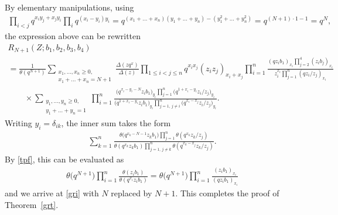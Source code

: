 By elementary manipulations, using
\begin{gather*}\prod\limits_{i<j}q^{x_iy_j+x_jy_i}\prod\limits_i q^{(x_i-y_i)y_i}=q^{(x_1+\dots+x_n)(y_1+\dots+y_n)-(y_1^2+\dots+y_n^2)}=q^{(N+1)\cdot 1-1}=q^N, \end{gather*}
the expression above can be rewritten
\begin{gather*}R_{N+1}(Z;b_1,b_2,b_3,b_4)\\
=\frac{1}{\theta(q^{N+1})}\sum_{\substack{x_1,\dots,x_n\geq 0,\\x_1+\dots+x_n=N+1}}
\frac{\Delta(zq^{x})}{\Delta(z)}\prod\limits_{1\leq i<j\leq n}q^{x_ix_j}(z_iz_j)_{x_i+x_j}
\prod\limits_{i=1}^n\frac{(qz_ib_1)_{x_i}\prod\limits_{j=2}^4(z_ib_j)_{x_i}}{z_i^{x_i}\prod\limits_{j=1}^n(qz_i/z_j)_{x_i}}
\\
\qquad{} \times\sum_{\substack{y_1,\dots,y_n\geq 0,\\y_1+\dots+y_n=1}}\prod\limits_{i=1}^n
\frac{\big(q^{x_i-y_i-N}z_ib_1\big)_{y_i}\prod\limits_{j=1}^n\big(q^{1+x_i-y_i}z_i/z_j\big)_{y_i}}{\big(q^{1+x_i-y_i}z_ib_1\big)_{y_i}
\prod\limits_{j=1,\,j\neq i}^n\big(q^{x_i-x_j}z_i/z_j\big)_{y_i}}.
\end{gather*}
Writing $y_i=\delta_{ik}$, the inner sum takes the form
\begin{gather*}\sum_{k=1}^n\frac{\theta\big(q^{x_k-N-1}z_kb_1\big)\prod\limits_{j=1}^n\theta(q^{x_k}z_k/z_j)}{\theta(q^{x_k}z_kb_1)\prod\limits_{j=1,\,j\neq k}^n\theta(q^{x_k-x_j}z_k/z_j)}. \end{gather*}
By \eqref{tpf}, this can be evaluated as{\samepage
\begin{gather*}
\theta\big(q^{N+1}\big)\prod\limits_{i=1}^n\frac{\theta(z_ib_1)}{\theta(q^{x_i}z_ib_1)}=\theta\big(q^{N+1}\big)
\prod\limits_{i=1}^n\frac{(z_ib_1)_{x_i}}{(qz_ib_1)_{x_i}}\end{gather*}
and we arrive at \eqref{gri} with $N$ replaced by $N+1$. This completes the proof of Theorem~\ref{grt}.}
